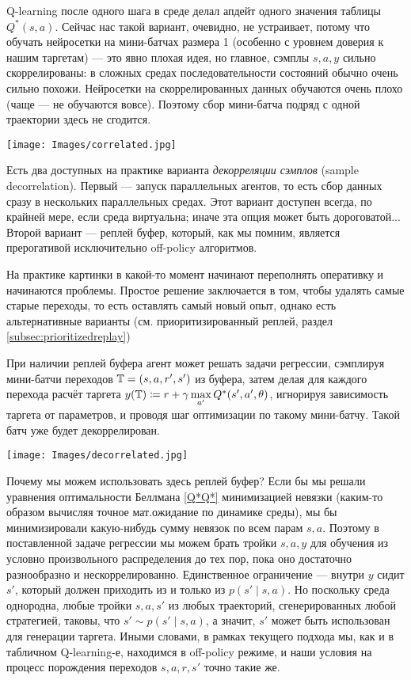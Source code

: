 Q-learning после одного шага в среде делал апдейт одного значения таблицы $Q^*(s, a)$. Сейчас нас такой вариант, очевидно, не устраивает, потому что обучать нейросетки на мини-батчах размера 1 (особенно с уровнем доверия к нашим таргетам) --- это явно плохая идея, но главное, сэмплы $s, a, y$ сильно скоррелированы: в сложных средах последовательности состояний обычно очень сильно похожи. Нейросетки на скоррелированных данных обучаются очень плохо (чаще --- не обучаются вовсе). Поэтому сбор мини-батча подряд с одной траектории здесь не сгодится.

\begin{center}
    \texttt{[image: Images/correlated.jpg]}
\end{center}

Есть два доступных на практике варианта \emph{декорреляции сэмплов} (sample decorrelation). Первый --- запуск параллельных агентов, то есть сбор данных сразу в нескольких параллельных средах. Этот вариант доступен всегда, по крайней мере, если среда виртуальна; иначе эта опция может быть дороговатой... Второй вариант --- реплей буфер, который, как мы помним, является прерогативой исключительно off-policy алгоритмов.

\begin{remark}
На практике картинки в какой-то момент начинают переполнять оперативку и начинаются проблемы. Простое решение заключается в том, чтобы удалять самые старые переходы, то есть оставлять самый новый опыт, однако есть альтернативные варианты (см. приоритизированный реплей, раздел \ref{subsec:prioritizedreplay})
\end{remark}

При наличии реплей буфера агент может решать задачи регрессии, сэмплируя мини-батчи переходов $\T \HM= (s, a, r', s')$ из буфера, затем делая для каждого перехода расчёт таргета $y(\T) \coloneqq r \HM+ \gamma \max\limits_{a'} Q^*(s', a', \theta)$, игнорируя зависимость таргета от параметров, и проводя шаг оптимизации по такому мини-батчу. Такой батч уже будет декоррелирован.

\begin{center}
    \texttt{[image: Images/decorrelated.jpg]}
\end{center}

Почему мы можем использовать здесь реплей буфер? Если бы мы решали уравнения оптимальности Беллмана \eqref{Q*Q*} минимизацией невязки (каким-то образом вычисляя точное мат.ожидание по динамике среды), мы бы минимизировали какую-нибудь сумму невязок по всем парам $s, a$. Поэтому в поставленной задаче регрессии мы можем брать тройки $s, a, y$ для обучения из условно произвольного распределения до тех пор, пока оно достаточно разнообразно и нескоррелированно. Единственное ограничение --- внутри $y$ сидит $s'$, который должен приходить из и только из $p(s' \mid s, a)$. Но поскольку среда однородна, любые тройки $s, a, s'$ из любых траекторий, сгенерированных любой стратегией, таковы, что $s' \sim p(s' \mid s, a)$, а значит, $s'$ может быть использован для генерации таргета. Иными словами, в рамках текущего подхода мы, как и в табличном Q-learning-е, находимся в off-policy режиме, и наши условия на процесс порождения переходов $s, a, r, s'$ точно такие же.

